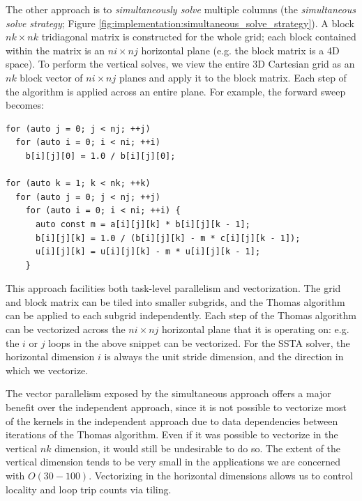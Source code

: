 \documentclass{sig-alternate-05-2015}
\begin{document}
The other approach is to \emph{simultaneously solve} multiple columns (the
  \emph{simultaneous solve strategy}; Figure
  \ref{fig:implementation:simultaneous_solve_strategy}).
A block \(nk \times nk\) tridiagonal matrix is constructed for the whole grid;
  each block contained within the matrix is an \(ni \times nj\) horizontal plane
  (e.g. the block matrix is a 4D space).
To perform the vertical solves, we view the entire 3D Cartesian grid as an
  \(nk\) block vector of \(ni \times nj\) planes and apply it to the block
  matrix.
Each step of the algorithm is applied across an entire plane.
For example, the forward sweep becomes:
\begin{lstlisting}
for (auto j = 0; j < nj; ++j)
  for (auto i = 0; i < ni; ++i) 
    b[i][j][0] = 1.0 / b[i][j][0];

for (auto k = 1; k < nk; ++k)
  for (auto j = 0; j < nj; ++j)
    for (auto i = 0; i < ni; ++i) {
      auto const m = a[i][j][k] * b[i][j][k - 1];
      b[i][j][k] = 1.0 / (b[i][j][k] - m * c[i][j][k - 1]);
      u[i][j][k] = u[i][j][k] - m * u[i][j][k - 1];
    } 
\end{lstlisting}
This approach facilities both task-level parallelism and vectorization.
The grid and block matrix can be tiled into smaller subgrids, and the Thomas
  algorithm can be applied to each subgrid independently.
Each step of the Thomas algorithm can be vectorized across the \(ni \times nj\)
  horizontal plane that it is operating on: e.g. the \(i\) or \(j\) loops in the
  above snippet can be vectorized.
For the SSTA solver, the horizontal dimension \(i\) is always the unit stride
  dimension, and the direction in which we vectorize.


The vector parallelism exposed by the simultaneous approach offers a major
  benefit over the independent approach, since it is not possible to vectorize
  most of the kernels in the independent approach due to data dependencies
  between iterations of the Thomas algorithm.
Even if it was possible to vectorize in the vertical \(nk\) dimension, it would
  still be undesirable to do so.
The extent of the vertical dimension tends to be very small in the applications
  we are concerned with \(O(30-100)\).
Vectorizing in the horizontal dimensions allows us to control locality and loop
  trip counts via tiling.
\end{document}
